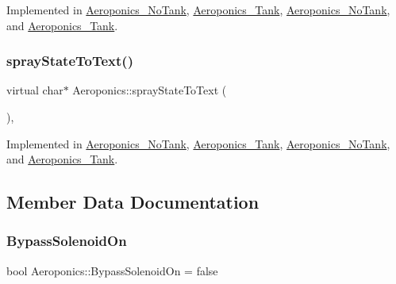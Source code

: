 Implemented in \hyperlink{class_aeroponics___no_tank_aa5c6ddd4017a8666d0205da53f04c36d}{Aeroponics\+\_\+\+No\+Tank}, \hyperlink{class_aeroponics___tank_a0c9c9616ee380d0e4dd0ccc41d7e7a0f}{Aeroponics\+\_\+\+Tank}, \hyperlink{class_aeroponics___no_tank_a9776da3e3fdf7d687609ba72ea59af5f}{Aeroponics\+\_\+\+No\+Tank}, and \hyperlink{class_aeroponics___tank_a822daf2443f3326cc4ba1ab1ba0c02f2}{Aeroponics\+\_\+\+Tank}.

\mbox{\label{class_aeroponics_aa79435aaa49a563d41ae092ec3e87e06}} 
\subsubsection{\texorpdfstring{spray\+State\+To\+Text()}{sprayStateToText()}\hspace{0.1cm}{\footnotesize\ttfamily [2/2]}}
{\footnotesize\ttfamily virtual char$\ast$ Aeroponics\+::spray\+State\+To\+Text (\begin{DoxyParamCaption}{ }\end{DoxyParamCaption})\hspace{0.3cm}{\ttfamily [protected]}, {}}



Implemented in \hyperlink{class_aeroponics___no_tank_aa5c6ddd4017a8666d0205da53f04c36d}{Aeroponics\+\_\+\+No\+Tank}, \hyperlink{class_aeroponics___tank_a0c9c9616ee380d0e4dd0ccc41d7e7a0f}{Aeroponics\+\_\+\+Tank}, \hyperlink{class_aeroponics___no_tank_a9776da3e3fdf7d687609ba72ea59af5f}{Aeroponics\+\_\+\+No\+Tank}, and \hyperlink{class_aeroponics___tank_a822daf2443f3326cc4ba1ab1ba0c02f2}{Aeroponics\+\_\+\+Tank}.



\subsection{Member Data Documentation}
\mbox{\label{class_aeroponics_a8acb5d5f9ffbdf8bbdb5c888464eaf24}} 
\subsubsection{\texorpdfstring{Bypass\+Solenoid\+On}{BypassSolenoidOn}}
{\footnotesize\ttfamily bool Aeroponics\+::\+Bypass\+Solenoid\+On = false\hspace{0.3cm}{\ttfamily [protected]}}



